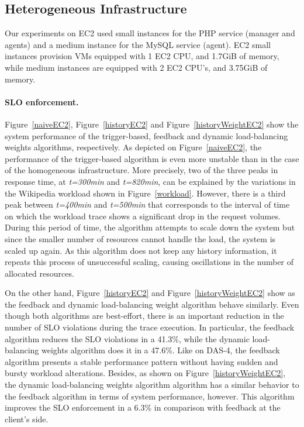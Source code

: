 


\subsection*{Heterogeneous Infrastructure}

Our experiments on EC2 used small instances for the PHP service (manager and agents) and  a medium instance for the MySQL service (agent). EC2 small instances provision VMs equipped with 1 EC2 CPU, and 1.7GiB of memory, while medium instances are equipped with 2 EC2 CPU's, and 3.75GiB of memory.


\paragraph{SLO enforcement.}
Figure~\ref{naiveEC2}, Figure~\ref{historyEC2} and Figure~\ref{historyWeightEC2} show the system performance of the trigger-based, feedback and dynamic load-balancing weights algorithms, respectively. As depicted on Figure~\ref{naiveEC2}, the performance of the trigger-based algorithm is even more unstable than in the case of the homogeneous infrastructure. More precisely, two of the three peaks in response time, at \emph{t=300min} and \emph{t=820min}, can be explained by the variations in the Wikipedia workload shown in Figure~\ref{workload}. However, there is a third peak between \emph{t=400min} and \emph{t=500min} that corresponds to the interval of time on which the workload trace shows a significant drop in the request volumes. During this period of time, the algorithm attempts to scale down the system but since the smaller number of resources cannot handle the load, the system is scaled up again. As this algorithm does not keep any history information, it repeats this process of unsuccessful scaling, causing oscillations in the number of allocated resources.  

On the other hand, Figure~\ref{historyEC2} and Figure~\ref{historyWeightEC2} show as the feedback and dynamic load-balancing weight algorithm behave similarly. Even though both algorithms are best-effort, there is an important reduction in the number of SLO violations during the trace execution. In particular, the feedback algorithm reduces the SLO violations in a  41.3\%, while the dynamic load-balancing weights algorithm does it in a 47.6\%. Like on DAS-4, the feedback algorithm presents a stable performance pattern without having sudden and bursty workload alterations. Besides, as shown on Figure~\ref{historyWeightEC2}, the dynamic load-balancing weights algorithm algorithm has a similar behavior to the feedback algorithm in terms of system performance, however. This algorithm improves the SLO enforcement in a 6.3\% in comparison with feedback at the client's side. 


